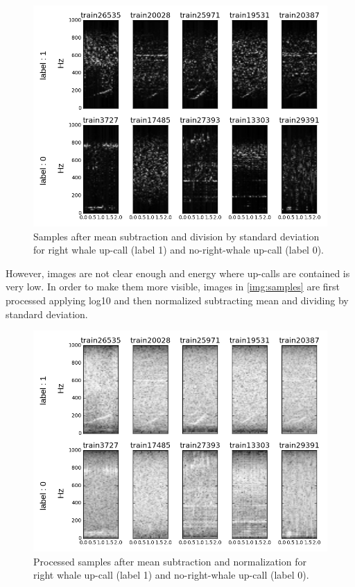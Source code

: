 \documentclass[]{article}
\begin{document}
\begin{figure}[htpb!]
\centering
\includegraphics[width= \textwidth]{./images/2_samples_unprocessed}
\caption{ Samples after mean subtraction and division by standard deviation for right whale up-call (label 1) and no-right-whale up-call (label 0).  \label{img:samples_unprocessed}}
\end{figure} 

However, images are not clear enough and energy where up-calls are contained is very low. In order to make them more visible, images in \ref{img:samples} are first processed applying log10 and then normalized subtracting mean and dividing by standard deviation.

\begin{figure}[htpb!]
\centering
\includegraphics[width= \textwidth]{./images/2_samples_processed}
\caption{Processed samples after mean subtraction and normalization for right whale up-call (label 1) and no-right-whale up-call (label 0).  \label{img:samples_processed}}
\end{figure} 
\end{document}
